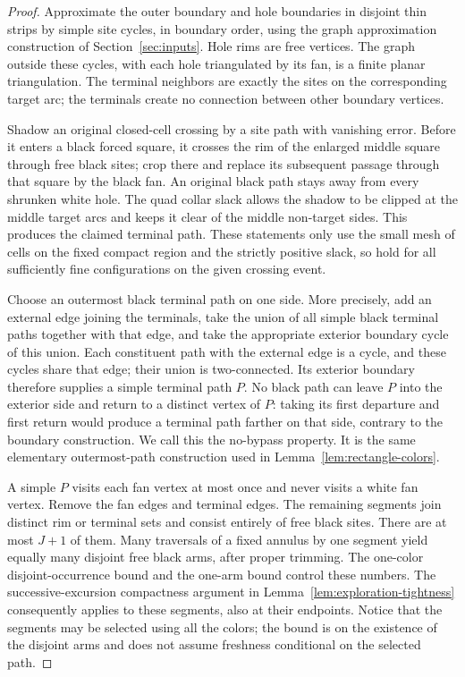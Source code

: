 \begin{proof}
Approximate the outer boundary and hole boundaries in disjoint thin strips
by simple site cycles, in boundary order, using the graph approximation
construction of Section~\ref{sec:inputs}. Hole rims are free vertices.
The graph outside these cycles, with each hole triangulated by its fan,
is a finite planar triangulation. The terminal neighbors are exactly the
sites on the corresponding target arc; the terminals create no connection
between other boundary vertices.

Shadow an original closed-cell crossing by a site path with vanishing error.
Before it enters a black forced square, it crosses the rim of the enlarged
middle square through free black sites; crop there and replace its subsequent
passage through that square by the black fan. An original black path stays
away from every shrunken white hole. The quad collar slack allows the shadow
to be clipped at the middle target arcs and keeps it clear of the middle
non-target sides. This produces the claimed terminal path. These statements
only use the small mesh of cells on the fixed compact region and the strictly
positive slack, so hold for all sufficiently fine configurations on the
given crossing event.

Choose an outermost black terminal path on one side. More precisely, add an
external edge joining the terminals, take the union of all simple black
terminal paths together with that edge, and take the appropriate exterior
boundary cycle of this union. Each constituent path with the external edge
is a cycle, and these cycles share that edge; their union is two-connected.
Its exterior boundary therefore supplies a simple terminal path $P$.
No black path can leave $P$ into the exterior side and return to a distinct
vertex of $P$: taking its first departure and first return would produce a
terminal path farther on that side, contrary to the boundary construction.
We call this the no-bypass property. It is the same elementary outermost-path
construction used in Lemma~\ref{lem:rectangle-colors}.

A simple $P$ visits each fan vertex at most once and never visits a white
fan vertex. Remove the fan edges and terminal edges. The remaining segments
join distinct rim or terminal sets and consist entirely of free black sites.
There are at most $J+1$ of them. Many traversals of a fixed annulus by one
segment yield equally many disjoint free black arms, after proper trimming.
The one-color disjoint-occurrence bound and the one-arm bound control these
numbers. The successive-excursion compactness argument in
Lemma~\ref{lem:exploration-tightness} consequently applies to these segments,
also at their endpoints. Notice that the segments may be selected using all
the colors; the bound is on the existence of the disjoint arms and does not
assume freshness conditional on the selected path.


\end{proof}
